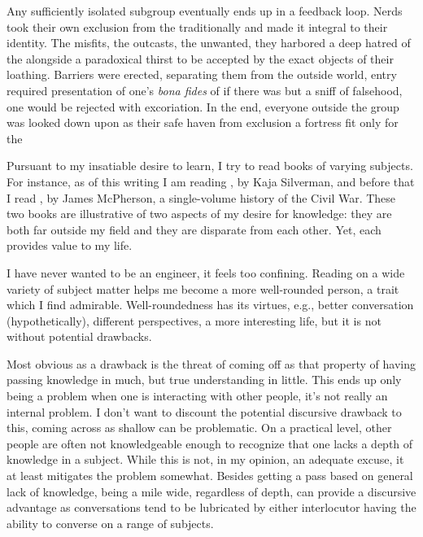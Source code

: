 \documentclass[../butidigress.tex]{subfiles}
\begin{document}
Any sufficiently isolated subgroup eventually ends up in a feedback loop.
Nerds took their own exclusion from the traditionally  and made it integral to their identity.
The misfits, the outcasts, the unwanted, they harbored a deep hatred of the  alongside a paradoxical thirst to be accepted by the exact objects of their loathing.
Barriers were erected, separating them from the outside world, entry required presentation of one's \textit{bona fides} of  if there was but a sniff of falsehood, one would be rejected with excoriation.
In the end, everyone outside the group was looked down upon as  their safe haven from exclusion a fortress fit only for the 


Pursuant to my insatiable desire to learn, I try to read books of varying subjects.
For instance, as of this writing I am reading , by Kaja Silverman, and before that I read , by James McPherson, a single-volume history of the Civil War.
These two books are illustrative of two aspects of my desire for knowledge: they are both far outside my field and they are disparate from each other.
Yet, each provides value to my life.

I have never wanted to be  an engineer, it feels too confining.
Reading on a wide variety of subject matter helps me become a more well-rounded person, a trait which I find admirable.
Well-roundedness has its virtues, e.g., better conversation (hypothetically), different perspectives, a more interesting life, but it is not without potential drawbacks.

Most obvious as a drawback is the threat of coming off as  that property of having passing knowledge in much, but true understanding in little.
This ends up only being a problem when one is interacting with other people, it's not really an internal problem.
I don't want to discount the potential discursive drawback to this, coming across as shallow can be problematic.
On a practical level, other people are often not knowledgeable enough to recognize that one lacks a depth of knowledge in a subject.
While this is not, in my opinion, an adequate excuse, it at least mitigates the problem somewhat.
Besides getting a pass based on general lack of knowledge, being a mile wide, regardless of depth, can provide a discursive advantage as conversations tend to be lubricated by either interlocutor having the ability to converse on a range of subjects.
\end{document}

